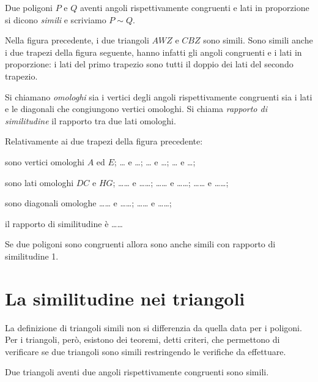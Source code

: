 \begin{definizione}
Due poligoni $P$ e $Q$ aventi angoli rispettivamente congruenti e lati in proporzione si dicono \emph{simili} e scriviamo $P\sim Q$.
\end{definizione}

Nella figura precedente, i due triangoli $AWZ$ e $CBZ$ sono simili.
Sono simili anche i due trapezi della figura seguente, hanno infatti gli angoli congruenti e i lati in proporzione: i lati del primo trapezio sono tutti il doppio dei lati del secondo trapezio.

\begin{definizione}
Si chiamano \emph{omologhi} sia i vertici degli angoli rispettivamente congruenti sia i lati e le diagonali che congiungono vertici omologhi. Si chiama \emph{rapporto di similitudine} il rapporto tra due lati omologhi.
\end{definizione}

Relativamente ai due trapezi della figura precedente:
\begin{itemize*}
\item sono vertici omologhi $A$ ed $E$; \ldots{} e \ldots{}; \ldots{} e \ldots{}; \ldots{} e \ldots{};
\item sono lati omologhi $DC$ e $HG$; \ldots\ldots{} e \ldots\ldots{}; \ldots\ldots{} e \ldots\ldots{}; \ldots\ldots{} e \ldots\ldots{};
\item sono diagonali omologhe \ldots\ldots{} e \ldots\ldots{}; \ldots\ldots{} e \ldots\ldots{};
\item il rapporto di similitudine è \ldots\ldots{}
\end{itemize*}

\osservazione Se due poligoni sono congruenti allora sono anche simili con rapporto di similitudine 1.


\section{La similitudine nei triangoli}

La definizione di triangoli simili non si differenzia da quella data per i poligoni. Per i triangoli, però, esistono dei teoremi, detti criteri, che permettono di verificare se due triangoli sono simili restringendo le verifiche da  effettuare.

\begin{teorema}
Due triangoli aventi due angoli rispettivamente congruenti sono simili.
\end{teorema}

